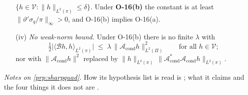 \begin{proposition}
\begin{enumerate}
$\{h\in\mathcal V:\|h\|_{L^{2}(\pi)}\le\delta\}$. Under \textbf{O-16\textup{(b)}} the constant is at
least $\|\vartheta'\sigma_q/\pi\|_\infty>0$, and O-16\textup{(b)} implies O-16\textup{(a)}.
\item[(iv)] \emph{No weak-norm bound.} Under O-16\textup{(b)} there is no finite $\lambda$ with
\begin{equation}\label{eq:noweak}
\tfrac12\big|\big\langle\mathcal Bh,h\big\rangle_{L^{2}(\pi)}\big|
\;\le\;\lambda\,\big\|\mathcal A_{\mathrm{cond}}h\big\|^{2}_{L^{2}(\Pi)}
\qquad\text{for all }h\in\mathcal V ;
\end{equation}
nor with $\|\mathcal A_{\mathrm{cond}}h\|^{2}$ replaced by
$\|h\|_{L^{2}(\pi)}\,\|\mathcal A^\ast_{\mathrm{cond}}\mathcal A_{\mathrm{cond}}h\|_{L^{2}(\pi)}$.
\end{enumerate}
\end{proposition}

\noindent\emph{Notes on \cref{prp:sharpquad}.} How its hypothesis list is read is
; what it claims and the four things it does not are
.


